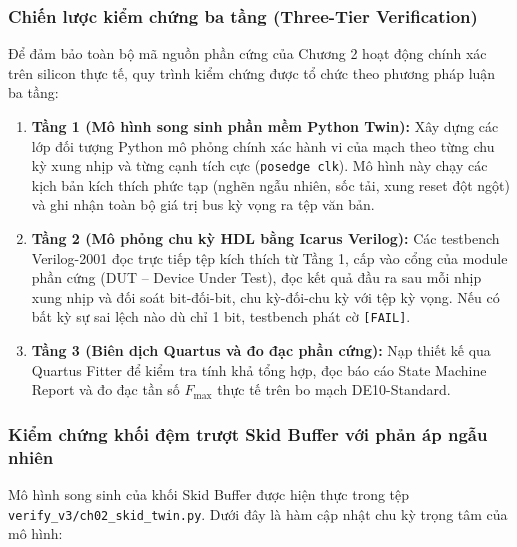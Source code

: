 \subsubsection*{Chiến lược kiểm chứng ba tầng (Three-Tier Verification)}
Để đảm bảo toàn bộ mã nguồn phần cứng của Chương 2 hoạt động chính xác trên silicon thực tế, quy trình kiểm chứng được tổ chức theo phương pháp luận ba tầng:
\begin{enumerate}[leftmargin=1.5em, itemsep=2pt]
    \item \textbf{Tầng 1 (Mô hình song sinh phần mềm Python Twin):} Xây dựng các lớp đối tượng Python mô phỏng chính xác hành vi của mạch theo từng chu kỳ xung nhịp và từng cạnh tích cực (\texttt{posedge clk}). Mô hình này chạy các kịch bản kích thích phức tạp (nghẽn ngẫu nhiên, sốc tải, xung reset đột ngột) và ghi nhận toàn bộ giá trị bus kỳ vọng ra tệp văn bản.
    \item \textbf{Tầng 2 (Mô phỏng chu kỳ HDL bằng Icarus Verilog):} Các testbench Verilog-2001 đọc trực tiếp tệp kích thích từ Tầng 1, cấp vào cổng của module phần cứng (DUT -- Device Under Test), đọc kết quả đầu ra sau mỗi nhịp xung nhịp và đối soát bit-đối-bit, chu kỳ-đối-chu kỳ với tệp kỳ vọng. Nếu có bất kỳ sự sai lệch nào dù chỉ 1 bit, testbench phát cờ \texttt{[FAIL]}.
    \item \textbf{Tầng 3 (Biên dịch Quartus và đo đạc phần cứng):} Nạp thiết kế qua Quartus Fitter để kiểm tra tính khả tổng hợp, đọc báo cáo State Machine Report và đo đạc tần số $F_{\max}$ thực tế trên bo mạch DE10-Standard.
\end{enumerate}

\subsubsection*{Kiểm chứng khối đệm trượt Skid Buffer với phản áp ngẫu nhiên}
Mô hình song sinh của khối Skid Buffer được hiện thực trong tệp \texttt{verify\_v3/ch02\_skid\_twin.py}. Dưới đây là hàm cập nhật chu kỳ trọng tâm của mô hình:

